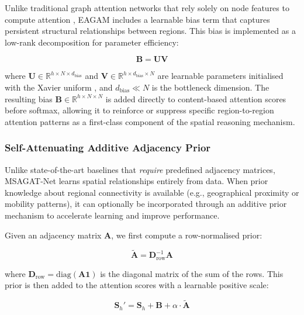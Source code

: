 \documentclass[final,1p,times]{elsarticle}
\begin{document}
Unlike traditional graph attention networks that rely solely on node features to compute attention \cite{velickovic2017graph}, EAGAM includes a learnable bias term that captures persistent structural relationships between regions. This bias is implemented as a low-rank decomposition for parameter efficiency:

\begin{equation}
\mathbf{B} = \mathbf{U} \mathbf{V}
\end{equation}

where $\mathbf{U} \in \mathbb{R}^{h \times N \times d_{\text{bias}}}$ and $\mathbf{V} \in \mathbb{R}^{h \times d_{\text{bias}} \times N}$ are learnable parameters initialised with the Xavier uniform \cite{glorot2010understanding}, and $d_{\text{bias}} \ll N$ is the bottleneck dimension. The resulting bias $\mathbf{B} \in \mathbb{R}^{h \times N \times N}$ is added directly to content-based attention scores before softmax, allowing it to reinforce or suppress specific region-to-region attention patterns as a first-class component of the spatial reasoning mechanism.

\subsubsection{Self-Attenuating Additive Adjacency Prior}
\label{sec:adj_prior}

Unlike state-of-the-art baselines that \emph{require} predefined adjacency matrices, MSAGAT-Net learns spatial relationships entirely from data. When prior knowledge about regional connectivity is available (e.g., geographical proximity or mobility patterns), it can optionally be incorporated through an additive prior mechanism to accelerate learning and improve performance.

Given an adjacency matrix $\mathbf{A}$, we first compute a row-normalised prior:

\begin{equation}
\tilde{\mathbf{A}} = \mathbf{D}_{\text{row}}^{-1}\mathbf{A}
\end{equation}

where $\mathbf{D}_{\text{row}} = \text{diag}(\mathbf{A}\mathbf{1})$ is the diagonal matrix of the sum of the rows. This prior is then added to the attention scores with a learnable positive scale:

\begin{equation}
\mathbf{S}_h' = \mathbf{S}_h + \mathbf{B} + \alpha \cdot \tilde{\mathbf{A}}
\end{equation}
\end{document}
